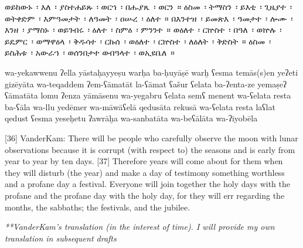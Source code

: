 \begin{ethiopictext}
    ወይከውኑ~፡ እለ~፡ ያስተሐይጹ~፡ ወርኀ~፡ በሑያጼ~፡ ወርን~።
    ዕስመ~፡ ትማስን~፡ ይእቲ~፡ ጊዜያተ~፡ ወትቀድም~፡ እምዓመታት~፡ ለዓመት~፡ ዐሡረ~፡ ዕለተ~።
    በእንተዝ~፡ ይመጽእ~፡ ዓመታተ~፡ ሎሙ~፡ እንዘ~፡ ያማስኑ~፡ ወይገብሩ~፡ ዕለተ~፡ ስምዕ~፡ ምንንተ~።
    ወዕለተ~፡ ርኵስተ~፡ በዓለ~፡ ወኵሉ~፡ ይዴምር~፡ ወማዋዕላ~፡ 
        ቅዱሳተ~፡ ርኩሰ~፡ ወዕለተ~፡ ርኵስተ~፡ ለዕለት~፡ ቅድስት~።
    ዕስመ~፡ ይስሕቱ~፡ አውራኀ~፡ ወሰንበታተ ወብዓላተ~፡ ወኢዩቤለ~።
\end{ethiopictext}
\begin{transliteration}
    wa-yekawwenu ʔella yāstaḥayyeṣu warḥa ba-ḥuyāṣē warḫ
    ʕesma temās(s)en yeʔeti gizēyāta wa-teqaddem ʔem-ʕāmatāt la-ʕāmat ʕašur ʕelata
    ba-ʔenta-ze yemaṣeʔ ʕāmatāta lomu ʔenza yāmāsenu wa-yegabru ʕelata semʕ menent
    wa-ʕelata resta ba-ʕāla wa-llu yedēmer wa-māwāʕelā 
        qedusāta rekusā wa-ʕelata resta laʕlat qedust
    ʕesma yeseḥetu ʔawrāḫa wa-sanbatāta wa-beʕālāta wa-ʔiyobēla
\end{transliteration}
\begin{translation}
    [36] VanderKam: There will be people who carefully observe the moon with lunar observations 
    because it is corrupt (with respect to) the seasons and is early from year to year by ten days. 
    [37] Therefore years will come about for them when they will disturb (the year) 
    and make a day of testimony something worthless and a profane day a festival. 
    Everyone will join together the holy days with the profane and the profane day with the holy day, 
    for they will err regarding the months, the sabbaths; the festivals, and the jubilee.

    
    \emph{**VanderKam's translation (in the interest of time). I will provide my own translation in subsequent drafts}
\end{translation}
